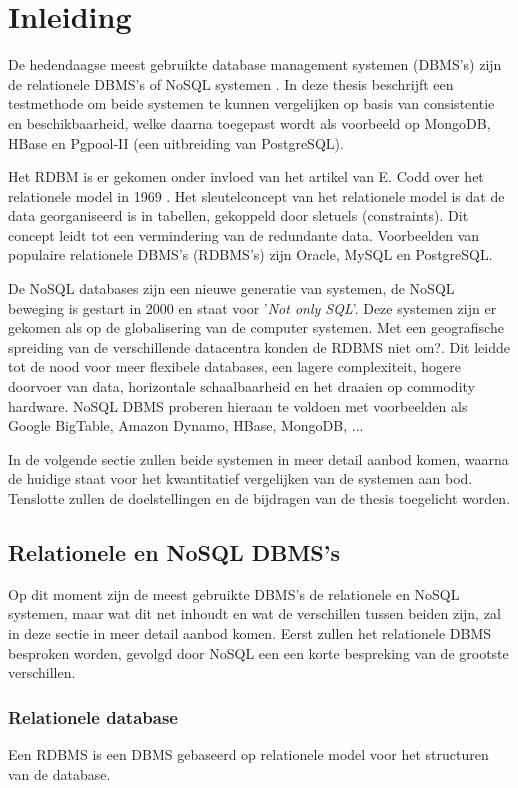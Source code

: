 \chapter{Inleiding}
De hedendaagse meest gebruikte database management systemen (DBMS's) zijn de relationele DBMS's of NoSQL systemen \cite{dbengine-ranking}. In deze thesis beschrijft een testmethode om beide systemen te kunnen vergelijken op basis van consistentie en beschikbaarheid, welke daarna toegepast wordt als voorbeeld op MongoDB, HBase en Pgpool-II (een uitbreiding van PostgreSQL). 

Het RDBM is er gekomen onder invloed van het artikel van E. Codd over het relationele model in 1969 \cite{codd1970relational}. Het sleutelconcept van het relationele model is dat de data georganiseerd is in tabellen, gekoppeld door sletuels (constraints). Dit concept leidt tot een vermindering van de redundante data. 
Voorbeelden van populaire relationele DBMS's (RDBMS's) zijn Oracle, MySQL en PostgreSQL. 

De NoSQL databases zijn een nieuwe generatie van systemen, de NoSQL beweging is gestart in 2000 en staat voor '\textit{Not only SQL}'. Deze systemen zijn er gekomen als op de globalisering van de computer systemen. Met een geografische spreiding van de verschillende datacentra konden de RDBMS niet om?. Dit leidde tot de nood voor meer flexibele databases, een lagere complexiteit, hogere doorvoer van data, horizontale schaalbaarheid en het draaien op commodity hardware. NoSQL DBMS proberen hieraan te voldoen met voorbeelden als Google BigTable, Amazon Dynamo, HBase, MongoDB, ... \cite{Strauch.NoSQL} 

In de volgende sectie zullen beide systemen in meer detail aanbod komen, waarna de huidige staat voor het kwantitatief vergelijken van de systemen aan bod. Tenslotte zullen de doelstellingen en de bijdragen van de thesis toegelicht worden. 

\section{Relationele en NoSQL DBMS's} 
Op dit moment zijn de meest gebruikte DBMS's de relationele en NoSQL systemen, maar wat dit net inhoudt en wat de verschillen tussen beiden zijn, zal in deze sectie in meer detail aanbod komen. Eerst zullen het relationele DBMS besproken worden, gevolgd door NoSQL een een korte bespreking van de grootste verschillen. 

\subsection{Relationele database}
Een RDBMS is een DBMS gebaseerd op relationele model voor het structuren van de database.

